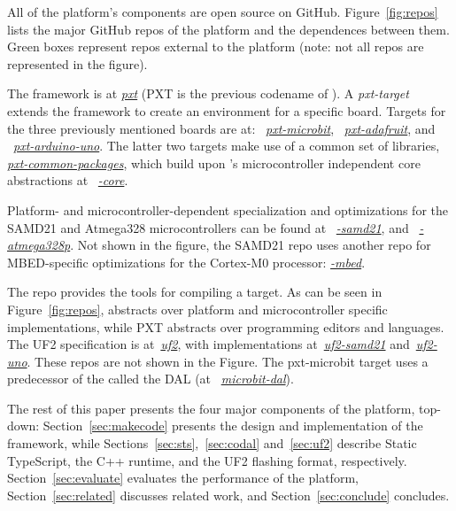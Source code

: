 All of the platform's components are open source on GitHub.
Figure~\ref{fig:repos} lists the major GitHub repos of the platform
and the dependences between them. Green boxes represent repos external to the platform
(note: not all repos are represented in the figure).

The \MC framework
is at \emph{\href{https://github.com/microsoft/pxt}{pxt}} (PXT is the previous codename of \MCN).
A \emph{pxt-target} extends the framework to create an environment for a specific board. Targets
for the three previously mentioned boards are at:
~\emph{\href{https://github.com/microsoft/pxt-microbit}{pxt-microbit}},
~\emph{\href{https://github.com/microsoft/pxt-adafruit}{pxt-adafruit}}, and
~\emph{\href{https://github.com/microsoft/pxt-arduino-uno}{pxt-arduino-uno}}.
The latter two targets make use of a common set of libraries,
\emph{\href{https://github.com/microsoft/pxt-common-packages}{pxt-common-packages}},
which build upon \CON's microcontroller independent core abstractions at
~\emph{\href{https://github.com/lancaster-university/\CO-core}{\COLN-core}}.

Platform- and microcontroller-dependent specialization and optimizations for
the SAMD21 and Atmega328 microcontrollers can be found at
~\emph{\href{https://github.com/lancaster-university/codal-samd21}{\COLN-samd21}},
and
~\emph{\href{https://github.com/lancaster-university/codal-atmega328p}{\COLN-atmega328p}}.
Not shown in the figure, the SAMD21 repo uses another repo for
MBED-specific optimizations for the Cortex-M0 processor: \emph{\href{https://github.com/lancaster-university/codal-mbed}{\COLN-mbed}}.

The repo \emph{\href{https://github.com/lancaster-university/codal}{\COLN}} provides the
tools for compiling a \CO target.  As can be seen in Figure~\ref{fig:repos},
\CO abstracts over platform and microcontroller specific
implementations, while PXT abstracts over programming editors and languages.
The UF2 specification is at~\emph{\href{https://github.com/microsoft/uf2}{uf2}},
with implementations at~\emph{\href{https://github.com/microsoft/uf2-samd21}{uf2-samd21}}
and~\emph{\href{https://github.com/mmoskal/uf2-uno}{uf2-uno}}. These repos are not
shown in the Figure.
The pxt-microbit target uses a predecessor of the \CO called the DAL (at
~\emph{\href{https://github.com/lancaster-university/microbit-dal}{microbit-dal}}).

The rest of this paper presents the four major components of the platform,
top-down: Section~\ref{sec:makecode} presents the design
and implementation of the \MC framework, while
Sections~\ref{sec:sts},~\ref{sec:codal} and~\ref{sec:uf2} describe Static TypeScript,
the \CO C++ runtime, and the UF2 flashing format, respectively.
Section~\ref{sec:evaluate} evaluates the performance of the platform,
Section~\ref{sec:related} discusses related work, and Section~\ref{sec:conclude}
concludes.
